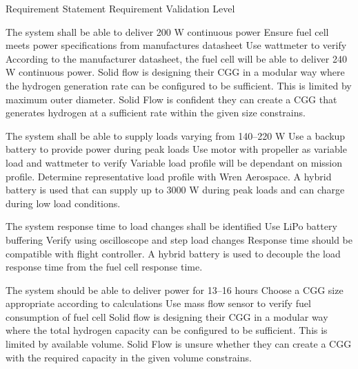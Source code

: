 \newcommand{\REQcategory}[1]{
    \DTLforeach[\DTLiseq{\type}{#1}]{requirements}
    {\type=type,\id=id}
    {
        \REQtable{\id}%
    }
}

{Requirement Statement}
{}
{}
{}
{Requirement Validation}
{Level}

{The system shall be able to deliver 200 W continuous power}
{Ensure fuel cell meets power specifications from manufactures datasheet}
{Use wattmeter to verify}
{}
{According to the manufacturer datasheet, the fuel cell will be able to deliver 240 W continuous power. Solid flow is designing their CGG in a modular way where the hydrogen generation rate can be configured to be sufficient. This is limited by maximum outer diameter. Solid Flow is confident they can create a CGG that generates hydrogen at a sufficient rate within the given size constrains.}
{}

{The system shall be able to supply loads varying from 140--220 W}
{Use a backup battery to provide power during peak loads}
{Use motor with propeller as variable load and wattmeter to verify}
{Variable load profile will be dependant on mission profile. Determine representative load profile with Wren Aerospace.}
{A hybrid battery is used that can supply up to 3000 W during peak loads and can charge during low load conditions.}
{}


{The system response time to load changes shall be identified}
{Use LiPo battery buffering}
{Verify using oscilloscope and step load changes}
{Response time should be compatible with flight controller.}
{A hybrid battery is used to decouple the load response time from the fuel cell response time.}
{}


{The system should be able to deliver power for 13--16 hours}
{Choose a CGG size appropriate according to calculations}
{Use mass flow sensor to verify fuel consumption of fuel cell}
{}
{Solid flow is designing their CGG in a modular way where the total hydrogen capacity can be configured to be sufficient. This is limited by available volume. Solid Flow is unsure whether they can create a CGG with the required capacity in the given volume constrains.}
{}

